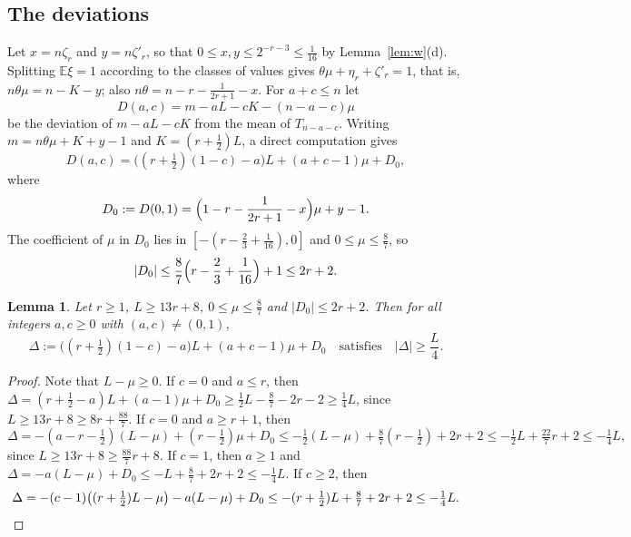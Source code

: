 \documentclass[11pt]{amsart}
\newtheorem{lemma}[theorem]{Lemma}
\numberwithin{equation}{section}
\newcommand{\E}{\mathbb E}
\begin{document}
\subsection*{The deviations}
Let $x=n\zeta_r$ and $y=n\zeta'_r$, so that $0\le x,y\le2^{-r-3}\le\frac1{16}$ by Lemma~\ref{lem:w}(d). Splitting $\E\xi=1$ according to the classes of values gives $\theta\mu+\eta_r+\zeta'_r=1$, that is, $n\theta\mu=n-K-y$; also $n\theta=n-r-\frac1{2r+1}-x$. For $a+c\le n$ let
\[
D(a,c)=m-aL-cK-(n-a-c)\mu
\]
be the deviation of $m-aL-cK$ from the mean of $T_{n-a-c}$. Writing $m=n\theta\mu+K+y-1$ and $K=(r+\frac12)L$, a direct computation gives
\begin{equation}\label{eq:D}
D(a,c)=\bigl((r+\tfrac12)(1-c)-a\bigr)L+(a+c-1)\mu+D_0,
\end{equation}
where
\[
D_0:=D(0,1)=\Bigl(1-r-\frac1{2r+1}-x\Bigr)\mu+y-1.
\]
The coefficient of $\mu$ in $D_0$ lies in $[-(r-\frac23+\frac1{16}),0]$ and $0\le\mu\le\frac87$, so
\begin{equation}\label{eq:D0}
|D_0|\le\frac87\Bigl(r-\frac23+\frac1{16}\Bigr)+1\le2r+2.
\end{equation}

\begin{lemma}\label{lem:case}
Let $r\ge1$, $L\ge13r+8$, $0\le\mu\le\frac87$ and $|D_0|\le2r+2$. Then for all integers $a,c\ge0$ with $(a,c)\ne(0,1)$,
\[
\Delta:=\bigl((r+\tfrac12)(1-c)-a\bigr)L+(a+c-1)\mu+D_0\quad\text{satisfies}\quad|\Delta|\ge\frac L4.
\]
\end{lemma}

\begin{proof}
Note that $L-\mu\ge0$.
If $c=0$ and $a\le r$, then $\Delta=(r+\frac12-a)L+(a-1)\mu+D_0\ge\frac12L-\frac87-2r-2\ge\frac14L$, since $L\ge13r+8\ge8r+\frac{88}7$.
If $c=0$ and $a\ge r+1$, then
\[
\Delta=-(a-r-\tfrac12)(L-\mu)+(r-\tfrac12)\mu+D_0\le-\tfrac12(L-\mu)+\tfrac87(r-\tfrac12)+2r+2\le-\tfrac12L+\tfrac{22}7r+2\le-\tfrac14L,
\]
since $L\ge13r+8\ge\frac{88}7r+8$.
If $c=1$, then $a\ge1$ and $\Delta=-a(L-\mu)+D_0\le-L+\frac87+2r+2\le-\frac14L$.
If $c\ge2$, then
\[
\Delta=-(c-1)\bigl((r+\tfrac12)L-\mu\bigr)-a(L-\mu)+D_0\le-(r+\tfrac12)L+\tfrac87+2r+2\le-\tfrac14L.\qedhere
\]
\end{proof}
\end{document}
